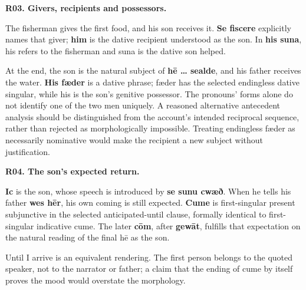 \par\begin{minipage}{\linewidth}\raggedright
\textbf{R03. Givers, recipients and possessors.}

The fisherman gives the first food, and his son receives it. \textbf{Se fiscere} explicitly names that giver; \textbf{him} is the dative recipient understood as the son. In \textbf{his suna}, his refers to the fisherman and suna is the dative son helped.

At the end, the son is the natural subject of \textbf{hē … sealde}, and his father receives the water. \textbf{His fæder} is a dative phrase; fæder has the selected endingless dative singular, while his is the son's genitive possessor. The pronouns' forms alone do not identify one of the two men uniquely. A reasoned alternative antecedent analysis should be distinguished from the account's intended reciprocal sequence, rather than rejected as morphologically impossible. Treating endingless fæder as necessarily nominative would make the recipient a new subject without justification.

\end{minipage}\par\addvspace{4pt}

\par\begin{minipage}{\linewidth}\raggedright
\textbf{R04. The son’s expected return.}

\textbf{Ic} is the son, whose speech is introduced by \textbf{se sunu cwæð}. When he tells his father \textbf{wes hēr}, his own coming is still expected. \textbf{Cume} is first-singular present subjunctive in the selected anticipated-until clause, formally identical to first-singular indicative cume. The later \textbf{cōm}, after \textbf{gewāt}, fulfills that expectation on the natural reading of the final hē as the son.

Until I arrive is an equivalent rendering. The first person belongs to the quoted speaker, not to the narrator or father; a claim that the ending of cume by itself proves the mood would overstate the morphology.

\end{minipage}\par\addvspace{4pt}

